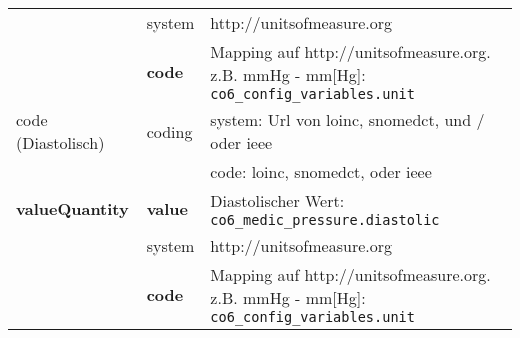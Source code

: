 \begin{longtable}{|l|l|p{7cm}|}
	\cline{2-3}
	& system & http://unitsofmeasure.org \\ 
	\cline{2-3}
	& \textbf{code} & Mapping auf http://unitsofmeasure.org. z.B. mmHg - mm[Hg]: \texttt{co6\_config\_variables.unit} \\ \hline
	code (Diastolisch)  & coding & system: Url von \ac{loinc}, \ac{snomedct}, und / oder \ac{ieee} \\ 
	\cline{3-3} 
	&  & code: \ac{loinc}, \ac{snomedct}, oder \ac{ieee} \\ \hline	
	\textbf{valueQuantity} & \textbf{value} & Diastolischer Wert: \texttt{co6\_medic\_pressure.diastolic} \\
	\cline{2-3}
	& system & http://unitsofmeasure.org \\ 
	\cline{2-3}
	& \textbf{code} & Mapping auf http://unitsofmeasure.org. z.B. mmHg - mm[Hg]: \texttt{co6\_config\_variables.unit} \\ \hline
\end{longtable}
\clearpage
